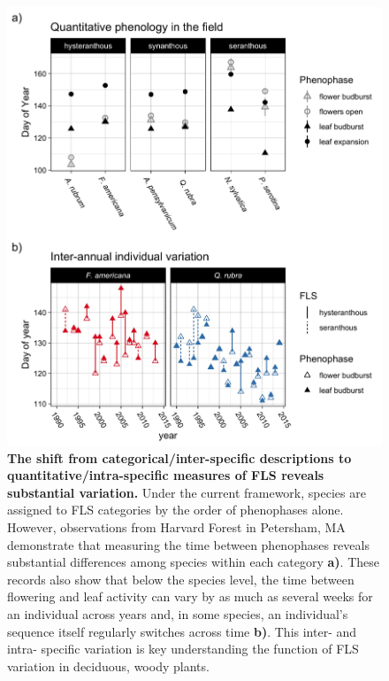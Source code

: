 \documentclass{article}
\begin{document}
 \begin{figure}[h!]
        \centering
          \includegraphics[width=\textwidth]{..//HarvardForest/FLS_viz.jpeg}
          \caption{\textbf{The shift from categorical/inter-specific descriptions to quantitative/intra-specific measures of FLS reveals substantial variation.} Under the current framework, species are assigned to FLS categories by the order of phenophases alone. However, observations from Harvard Forest in Petersham, MA demonstrate that measuring the time between phenophases reveals substantial differences among species within each category \textbf{a)}. These records also show that below the species level, the time between flowering and leaf activity can vary by as much as several weeks for an individual across years and, in some species, an individual's sequence itself regularly switches across time  \textbf{b)}. This inter- and intra- specific variation is key understanding the function of FLS variation in deciduous, woody plants.}
        \label{fig:vizzy}
    \end{figure}

\pagebreak  
\end{document}
